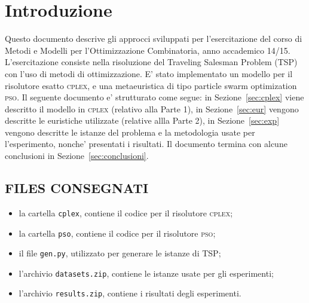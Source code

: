 \documentclass[
12pt, %
a4paper, %
oneside, %
headinclude,footinclude, %
BCOR5mm, %
]{scrartcl}
\begin{document}





\section{Introduzione}

Questo documento descrive gli approcci sviluppati per l'esercitazione del corso di Metodi e Modelli per l'Ottimizzazione Combinatoria, anno accademico 14/15. L'esercitazione consiste nella risoluzione del  Traveling Salesman Problem (TSP) con l'uso di metodi di ottimizzazione. E' stato implementato un modello per il risolutore esatto \textsc{cplex}, e una metaeuristica di tipo particle swarm optimization \textsc{pso}. Il seguente documento e' strutturato come segue: in Sezione~\ref{sec:cplex} viene descritto il modello in \textsc{cplex} (relativo alla Parte 1), in Sezione~\ref{sec:eur} vengono descritte le euristiche utilizzate (relative allla Parte 2), in Sezione~\ref{sec:exp} vengono descritte le istanze del problema e la metodologia usate per l'esperimento, nonche' presentati i risultati. Il documento termina con alcune conclusioni in Sezione~\ref{sec:conclusioni}.

\subsection{FILES CONSEGNATI} 
\begin{itemize}
\setlength\itemsep{0.05cm}
\item la cartella \texttt{cplex}, contiene il codice per il risolutore \textsc{cplex};
\item la cartella \texttt{pso}, contiene il codice per il risolutore \textsc{pso};
\item il file \texttt{gen.py}, utilizzato per generare le istanze di TSP;
\item l'archivio \texttt{datasets.zip}, contiene le istanze usate per gli esperimenti;
\item l'archivio \texttt{results.zip}, contiene i risultati degli esperimenti.
\end{itemize}
\end{document}
